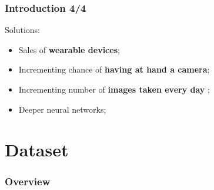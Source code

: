 \documentclass{beamer}
\begin{document}
\begin{frame}
\frametitle{Introduction 4/4}
Solutions:
\begin{itemize}
\item Sales of \textbf{wearable devices};
\item Incrementing chance of \textbf{having at hand a camera};
\item Incrementing number of \textbf{images taken every day} \cite{photos};
\item Deeper neural networks;
\end{itemize}
\end{frame}

\section{Dataset}

\begin{frame}
\frametitle{Overview} 
  \tableofcontents[currentsection]
\end{frame}
\end{document}
